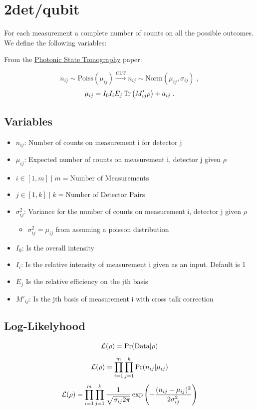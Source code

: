 \documentclass{article}
\begin{document}
\section{2det/qubit}
For each measurement a complete number of counts on all the possible outcomes. We define the following variables:

From the \href{http://research.physics.illinois.edu/QI/Photonics/tomography-files/amo_tomo_chapter.pdf}{Photonic State Tomography} paper:

$$n_{ij} \sim \text{Poiss}(\mu_{ij}) \xrightarrow{\text{CLT}} n_{ij} \sim \text{Norm}(\mu_{ij},\sigma_{ij})\;,$$
$$\mu_{ij} = I_0 I_i E_j \operatorname{Tr}\left( M'_{ij} \rho \right) + a_{ij}\;.$$

\subsection{Variables}

\begin{itemize}
\item $n_{ij}$: Number of counts on measurement i for detector j
\item $\mu_{ij}$: Expected number of counts on measurement i, detector j  given $\rho$
\item $i \in[1,m] \; \big| \; m = \text{Number of Measurements}$
\item $j \in[1,k] \; \big| \; k = \text{Number of Detector Pairs}$
\item $\sigma_{ij}^2$: Variance for the number of counts on measurement i, detector j given $\rho$
\begin{itemize}
    \item  $\sigma_{ij}^2 = \mu_{ij}$ from assuming a poisson distribution
\end{itemize}
\item $I_0$: Is the overall intensity
\item $I_i$: Is the relative intensity of measurement i given as an input. Default is 1
\item $E_j$ Is the relative efficiency on the jth basis
\item $M'_{ij}$: Is the jth basis of measurement i with cross talk correction
\end{itemize}

\subsection{Log-Likelyhood}

$$\mathcal{L}(\rho) = \text{Pr}(\text{Data}|\rho)$$
$$\mathcal{L}(\rho) = \prod_{i=1}^m \prod_{j=1}^k  \text{Pr}(n_{ij}|\mu_{ij})$$
$$\mathcal{L}(\rho) = \prod_{i=1}^m \prod_{j=1}^k  \frac{1}{\sqrt{\sigma_{ij}2\pi}}
                \exp\left( -\frac{(n_{ij}-\mu_{ij})^2}{2\sigma_{ij}^2} \right)$$
\end{document}
